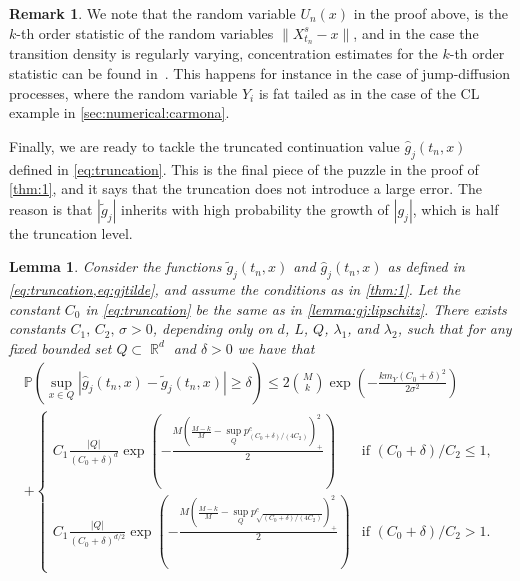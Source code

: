 \documentclass[11pt,reqno,a4paper]{amsart}
\newtheorem{lemma}[theorem]{Lemma}
\theoremstyle{definition}
\newtheorem{remark}[theorem]{Remark}
\numberwithin{equation}{section}
\renewcommand{\P}{\mathbb{P}}
\DeclareMathOperator{\R}{\mathbb{R}}
\DeclareMathOperator{\1}{\mathbbm{1}}
\begin{document}
\begin{remark}
  We note that the random variable $U_n(x)$ in the proof above, is the $k$-th order statistic of the random variables $\|X_{t_n}^{s} - x\|$, and in the case the transition density is regularly varying, concentration estimates for the $k$-th order statistic can be found in~\cite{pere2023hill}. This happens for instance in the case of jump-diffusion processes, where the random variable $Y_i$ is fat tailed as in the case of the CL example in \cref{sec:numerical:carmona}.
\end{remark}

Finally, we are ready to tackle the truncated continuation value $\widehat{g}_j(t_n,x)$ defined in \cref{eq:truncation}. This is the final piece of the puzzle in the proof of \cref{thm:1}, and it says that the truncation does not introduce a large error. The reason is that $|\widetilde{g}_j|$ inherits with high probability the growth of $|g_j|$, which is half the truncation level.
\begin{lemma} \label{lemma:gjhat:gjtilde}
  Consider the functions $\widetilde{g}_j(t_n,x)$ and $\widehat{g}_j(t_n,x)$ as defined in \cref{eq:truncation,eq:gjtilde}, and assume the conditions as in \cref{thm:1}. Let the constant $C_0$ in \cref{eq:truncation} be the same as in \cref{lemma:gj:lipschitz}.
  There exists constants $C_1,\, C_2,\, \sigma > 0$, depending only on $d$, $L$, $Q$, $\lambda_1$, and $\lambda_2$,
  such that	for any fixed bounded set $Q \subset \R^d$ and $\delta > 0$ we have that
  \begin{multline*}
    \P(\sup_{x \in Q}  |\widehat{g}_j(t_n,x) - \widetilde{g}_j(t_n,x)| \geq \delta)
    \leq
    2{\binom{M}{k}} \exp \left (-\frac{k m_Y(C_0+\delta)^2}{2 \sigma^2} \right )
    \\
    +
    \begin{cases}
      C_1 \frac{|Q|}{(C_0+\delta)^d} \exp \left (-\frac{M \left (\frac{M-k}{M} - \sup_Q p_{(C_0+\delta)/(4 C_2)}^c \right )_+^2}{2} \right )            & \text{if } (C_0+\delta)/C_2 \leq 1,
      \\
      C_1 \frac{|Q|}{(C_0+\delta)^{d/2}} \exp \left (-\frac{M \left (\frac{M-k}{M} - \sup_Q p_{\sqrt{(C_0+\delta)/(4 C_2)}}^c \right )_+^2}{2} \right ) & \text{if } (C_0+\delta)/C_2 > 1.
    \end{cases}
  \end{multline*}
\end{lemma}
\end{document}
